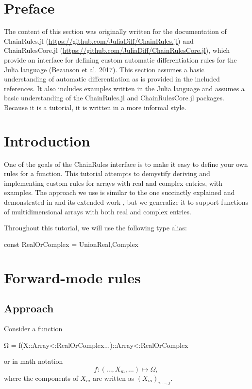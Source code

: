 \documentclass[../main.tex]{subfiles}
\begin{document}
\begin{refsection}

\section{Preface}\label{preface}

The content of this section was originally written for the documentation of ChainRules.jl (\url{https://github.com/JuliaDiff/ChainRules.jl}) and ChainRulesCore.jl (\url{https://github.com/JuliaDiff/ChainRulesCore.jl}), which provide an interface for defining custom automatic differentiation rules for the Julia language (Bezanson et al. \protect\hyperlink{ref-Julia-2017}{2017}).
This section assumes a basic understanding of automatic differentiation as is provided in the included references.
It also includes examples written in the Julia language and assumes a basic understanding of the ChainRules.jl and ChainRulesCore.jl packages.
Because it is a tutorial, it is written in a more informal style.

\section{Introduction}\label{introduction}

One of the goals of the ChainRules interface is to make it easy to define your own rules for a function.
This tutorial attempts to demystify deriving and implementing custom rules for arrays with real and complex entries, with examples.
The approach we use is similar to the one succinctly explained and demonstrated in \cite{giles_collected_2008} and its extended work \cite{giles_extended_2008}, but we generalize it to support functions of multidimensional arrays with both real and complex entries.

Throughout this tutorial, we will use the following type alias:
\begin{juliacode}
const RealOrComplex = Union{Real,Complex}
\end{juliacode}
\section{Forward-mode rules}\label{forward-mode-rules}

\subsection{Approach}\label{approach}

Consider a function
\begin{juliacode}
Ω = f(X::Array{<:RealOrComplex}...)::Array{<:RealOrComplex}
\end{juliacode}
or in math notation
\[f \colon (\ldots, X_m, \ldots) \mapsto \Omega,\]
where the components of $X_m$ are written as $(X_m)_{i,\ldots,j}$.


\end{refsection}
\end{document}
